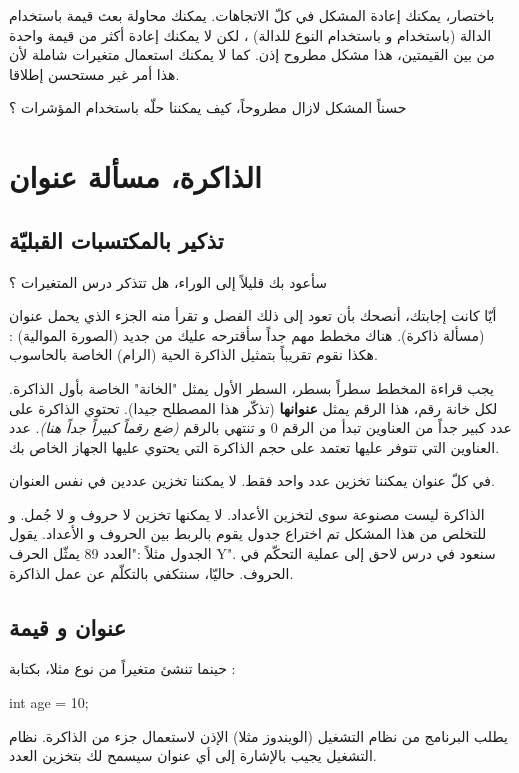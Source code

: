 باختصار، يمكنك إعادة المشكل في كلّ الاتجاهات. يمكنك محاولة بعث قيمة باستخدام الدالة (باستخدام
و باستخدام النوع
للدالة) ، لكن لا يمكنك إعادة أكثر من قيمة واحدة من بين القيمتين، هذا مشكل مطروح إذن. كما لا يمكنك استعمال متغيرات شاملة لأن هذا أمر غير مستحسن إطلاقا.

حسناً المشكل لازال مطروحاً، كيف يمكننا حلّه باستخدام المؤشرات ؟

\section{الذاكرة، مسألة عنوان}
\subsection{تذكير بالمكتسبات القبليّة}
سأعود بك قليلاً إلى الوراء، هل تتذكر درس المتغيرات ؟

أيّا كانت إجابتك، أنصحك بأن تعود إلى ذلك الفصل و تقرأ منه الجزء الذي يحمل عنوان (مسألة ذاكرة). هناك مخطط مهم جداً سأقترحه عليك من جديد (الصورة الموالية) :
هكذا نقوم تقريباً بتمثيل الذاكرة الحية (الرام) الخاصة بالحاسوب.

يجب قراءة المخطط سطراً بسطر، السطر الأول يمثل "الخانة" الخاصة بأول الذاكرة. لكل خانة رقم، هذا الرقم يمثل
\textbf{عنوانها}
(تذكّر هذا المصطلح جيدا). تحتوي الذاكرة على عدد كبير جداً من العناوين تبدأ من الرقم 0 و تنتهي بالرقم
\textit{(ضع رقماً كبيراً جداً هنا)}.
عدد العناوين التي تتوفر عليها تعتمد على حجم الذاكرة التي يحتوي عليها الجهاز الخاص بك.

في كلّ عنوان يمكننا تخزين عدد واحد فقط. لا يمكننا تخزين عددين في نفس العنوان.

الذاكرة ليست مصنوعة سوى لتخزين الأعداد. لا يمكنها تخزين لا حروف و لا جُمل. و للتخلص من هذا المشكل تم اختراع جدول يقوم بالربط بين الحروف و الأعداد. يقول الجدول مثلاً :"العدد 89 يمثّل الحرف
\textenglish{Y}".
سنعود في درس لاحق إلى عملية التحكّم في الحروف. حاليّا، سنتكفي بالتكلّم عن عمل الذاكرة.

\subsection{عنوان و قيمة}
حينما تنشئ متغيراً
من نوع
مثلا، بكتابة :
\begin{Csource}
int age = 10;
\end{Csource}
يطلب البرنامج من نظام التشغيل (الويندوز مثلا) الإذن لاستعمال جزء من الذاكرة. نظام التشغيل يجيب بالإشارة إلى أي عنوان سيسمح لك بتخزين العدد.

